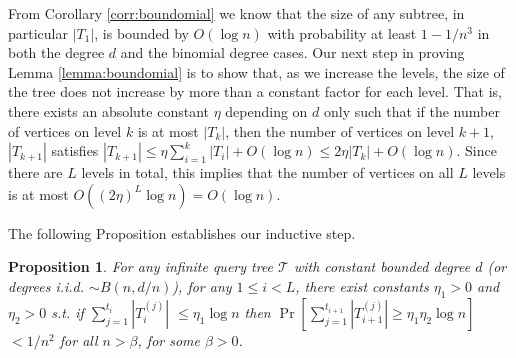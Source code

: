 \documentclass[english, oribibl]{llncs}
\newtheorem{proposition}[theorem]{Proposition}
\newcommand{\mygamma}{L}
\begin{document}
\label{section:increase}

From Corollary \ref{corr:boundomial} we know that the size of any subtree, in particular $|T_1|$,
is bounded by $O(\log n)$ with probability at least $1-1/n^3$
in both the degree $d$ and the binomial degree cases.
Our next step in proving
Lemma \ref{lemma:boundomial} 
is to show that, as we increase the levels,
the size of the tree does not increase by more than a constant factor for each level.
That is, there exists an absolute constant $\eta$ depending on $d$ only
such that if the number of vertices on level $k$ is at most $|T_k|$,
then the number of vertices on level $k+1$, $|T_{k+1}|$ satisfies
$|T_{k+1}|\leq \eta \sum_{i=1}^{k}|{T_{i}}|+O(\log n) \leq  2\eta|T_{k}|+O(\log n) $. Since there are $\mygamma$ levels in total, this implies that
the number of vertices on all $\mygamma$ levels is at most
$O((2\eta)^{\mygamma} \log n)=O(\log n)$.


The following Proposition establishes our inductive step.
\begin{proposition}
\label{infinite}
For any infinite query tree $\mathcal{T}$ with constant bounded degree $d$ (or degrees i.i.d. $\sim B(n, d/n)$), for any $1\leq i< \mygamma$,
there exist constants $\eta_1>0$ and $\eta_2>0$
s.t. if $\sum_{j=1}^{t_i}|T_i^{(j)}| $ $\leq \eta_1 \log{n}$
then $\Pr[\sum_{j=1}^{t_{i+1}}|T_{i+1}^{(j)}| \geq \eta_1 \eta_2 \log{n}]$ $ < 1/n^2$ for all $n>\beta$,
for some $\beta>0$.
\end{proposition}
\end{document}
